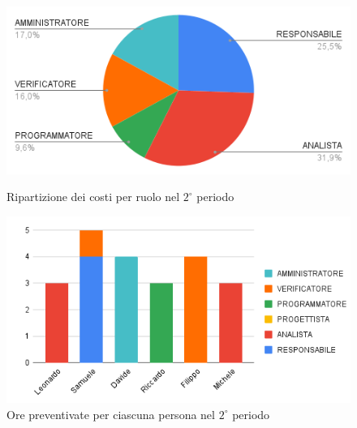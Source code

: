 \begin{figure}[H]
  \centering
  \includegraphics[width=0.6\linewidth]{grafici/2_periodo_torta.png}
  \caption{Ripartizione dei costi per ruolo nel $2^\circ$ periodo}
        \vspace{10mm}
  \includegraphics[width=0.7\linewidth]{grafici/2_periodo_istogramma.png}
  \caption{Ore preventivate per ciascuna persona nel $2^\circ$ periodo}
\end{figure}



